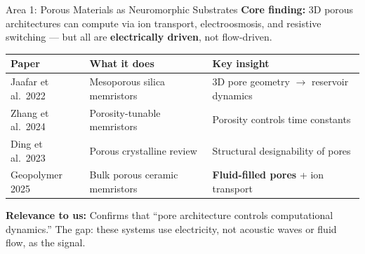 \documentclass[aspectratio=169,11pt]{beamer}
\begin{document}
\begin{frame}{Area 1: Porous Materials as Neuromorphic Substrates}
  \textbf{Core finding:} 3D porous architectures can compute via ion transport, electroosmosis, and resistive switching --- but all are \textbf{electrically driven}, not flow-driven.

  \vspace{0.2cm}
  \begin{table}
    \centering
    \footnotesize
    \renewcommand{\arraystretch}{1.05}
    \begin{tabular}{@{}>{\raggedright}p{2.8cm}>{\raggedright}p{4.8cm}>{\raggedright\arraybackslash}p{4.8cm}@{}}
      \toprule
      \textbf{Paper} & \textbf{What it does} & \textbf{Key insight} \\
      \midrule
      Jaafar et al.\ 2022 & Mesoporous silica memristors & 3D pore geometry $\to$ reservoir dynamics \\
      Zhang et al.\ 2024 & Porosity-tunable memristors & Porosity controls time constants \\
      Ding et al.\ 2023 & Porous crystalline review & Structural designability of pores \\
      Geopolymer 2025 & Bulk porous ceramic memristors & \textbf{Fluid-filled pores} + ion transport \\
      \bottomrule
    \end{tabular}
  \end{table}

  \vspace{0.1cm}
  \textbf{Relevance to us:} Confirms that ``pore architecture controls computational dynamics.'' The gap: these systems use electricity, not acoustic waves or fluid flow, as the signal.
\end{frame}
\end{document}
